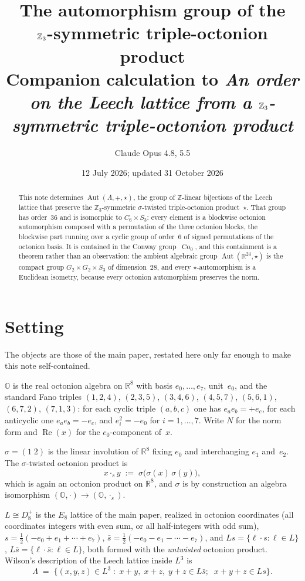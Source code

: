 \documentclass[11pt]{amsart}
\title[The automorphism group of the triple-octonion product]%
{The automorphism group of the\\
$\ZZ_3$-symmetric triple-octonion product\\
\large Companion calculation to
\emph{An order on the Leech lattice from a $\ZZ_3$-symmetric
triple-octonion product}}
\author{Claude Opus 4.8, 5.5}
\date{12 July 2026; updated 31 October 2026}
\newcommand{\LL}{\Lambda}
\newcommand{\OO}{\mathbb{O}}
\newcommand{\ZZ}{\mathbb{Z}}
\newcommand{\RR}{\mathbb{R}}
\newcommand{\Nrm}{N}
\DeclareMathOperator{\Aut}{Aut}
\DeclareMathOperator{\Co}{Co}
\DeclareMathOperator{\Rea}{Re}
\theoremstyle{definition}
\theoremstyle{remark}
\begin{document}
\maketitle

\begin{abstract}
This note determines $\Aut(\LL, +, \star)$,
the group of $\ZZ$-linear bijections of the Leech lattice that preserve the
$\ZZ_3$-symmetric $\sigma$-twisted triple-octonion product~$\star$.
That group has order~$36$ and is isomorphic to $C_6 \times S_3$: every
element is a blockwise octonion automorphism composed with a permutation
of the three octonion blocks, the blockwise part running over a cyclic
group of order~$6$ of signed permutations of the octonion basis.
It is contained in the Conway group~$\Co_0$, and this containment is a
theorem rather than an observation: the ambient algebraic group
$\Aut(\RR^{24}, \star)$ is the compact group $G_2 \times G_2 \times S_3$
of dimension~$28$, and every $\star$-automorphism is a Euclidean
isometry, because every octonion automorphism preserves the norm.
\end{abstract}

\section{Setting}\label{sec:setting}

The objects are those of the main paper, restated here only far enough to
make this note self-contained.

$\OO$ is the real octonion algebra on $\RR^8$ with basis
$e_0, \ldots, e_7$, unit~$e_0$, and the standard Fano triples
$(1,2,4)$, $(2,3,5)$, $(3,4,6)$, $(4,5,7)$, $(5,6,1)$, $(6,7,2)$,
$(7,1,3)$: for each cyclic triple $(a,b,c)$ one has $e_a e_b = +e_c$, for
each anticyclic one $e_a e_b = -e_c$, and $e_i^2 = -e_0$ for
$i = 1, \ldots, 7$. Write $\Nrm$ for the norm form and $\Rea(x)$ for the
$e_0$-component of~$x$.

$\sigma = (1\;2)$ is the linear involution of $\RR^8$ fixing $e_0$ and
interchanging $e_1$ and~$e_2$. The $\sigma$-twisted octonion product is
\[
  x \cdot_s y \;:=\; \sigma\bigl(\sigma(x)\,\sigma(y)\bigr),
\]
which is again an octonion product on $\RR^8$, and $\sigma$ is by
construction an algebra isomorphism
$(\OO, \cdot) \to (\OO, \cdot_s)$.

$L \cong D_8^+$ is the $E_8$ lattice of the main paper, realized in
octonion coordinates (all coordinates integers with even sum, or all
half-integers with odd sum),
$s = \tfrac12(-e_0 + e_1 + \cdots + e_7)$,
$\bar s = \tfrac12(-e_0 - e_1 - \cdots - e_7)$, and
$Ls = \{\ell \cdot s : \ell \in L\}$,
$L\bar s = \{\ell \cdot \bar s : \ell \in L\}$, both formed with the
\emph{untwisted} octonion product. Wilson's description of the Leech
lattice inside $L^3$ is
\begin{equation}\label{eq:wilson}
  \LL \;=\; \bigl\{ (x,y,z) \in L^3 \;:\;
    x + y,\; x + z,\; y + z \in L\bar s; \;\;
    x + y + z \in Ls \bigr\}.
\end{equation}
\end{document}
